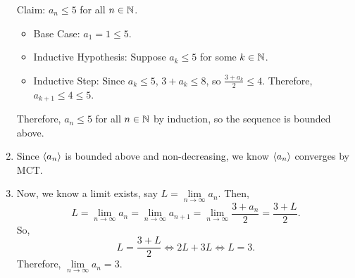 \begin{Example}{}{}
\begin{enumerate}[(1)]
              Claim: $ a_n\le 5 $ for all $ n\in\mathbb{N} $.
              \begin{itemize}
                  \item Base Case: $ a_1=1\le 5 $.
                  \item Inductive Hypothesis: Suppose $ a_k\le 5 $
                        for some $ k\in\mathbb{N} $.
                  \item Inductive Step: Since $ a_k\le 5 $, $ 3+a_k\le 8 $,
                        so $ \frac{3+a_k}{2}\le 4 $. Therefore, $ a_{k+1}\le 4\le 5 $.
              \end{itemize}
              Therefore, $ a_n\le 5 $ for all $ n\in\mathbb{N} $ by induction,
              so the sequence is bounded above.
        \item Since $ \langle a_n\rangle $ is bounded above and non-decreasing,
              we know $ \langle a_n\rangle $ converges by MCT\@.
        \item Now, we know a limit exists, say $ L=\lim\limits_{{n} \to {\infty}}a_n $.
              Then,
              \[ L=\lim\limits_{{n} \to {\infty}}a_n=\lim\limits_{{n} \to {\infty}}a_{n+1}
                  =\lim\limits_{{n} \to {\infty}}\frac{3+a_n}{2}=\frac{3+L}{2}. \]
              So,
              \[ L=\frac{3+L}{2}\iff 2L+3L\iff L=3. \]
              Therefore, $ \lim\limits_{{n} \to {\infty}}a_n=3 $.
    \end{enumerate}
\end{Example}
